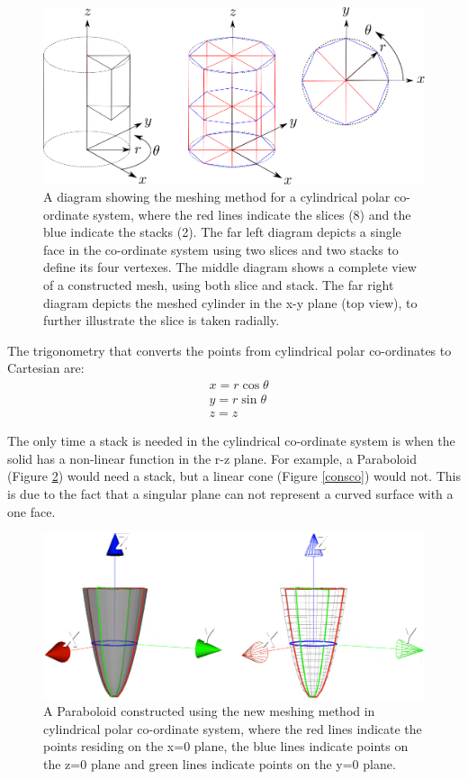 \documentclass[12pt,a4paper]{article}
\begin{document}
\begin{figure}[h!]
\centering
\includegraphics[scale=0.45]{Images//Coords//cyl.png}
\caption[width=\columnwidth]{A diagram showing the meshing method for a cylindrical polar co-ordinate system, where the red lines indicate the slices (8) and the blue indicate the stacks (2). The far left diagram depicts a single face in the co-ordinate system using two slices and two stacks to define its four vertexes. The middle diagram shows a complete view of a constructed mesh, using both slice and stack. The far right diagram depicts the meshed cylinder in the x-y plane (top view), to further illustrate the slice is taken radially.}
\label{cylmeshin}
\end{figure}
The trigonometry that converts the points from cylindrical polar co-ordinates to Cartesian are:
\begin{equation}
\begin{aligned}
\label{cyctrig}
& x = r \cos{\theta} \\
& y = r \sin{\theta} \\
& z = z
\end{aligned}
\end{equation}

\noindent The only time a stack is needed in the cylindrical co-ordinate system is when the solid has a non-linear function in the r-z plane. For example, a Paraboloid (Figure \ref{paraco}) would need a stack, but a linear cone (Figure \ref{consco}) would not. This is due to the fact that a singular plane can not represent a curved surface with a one face. 

\begin{figure}[h!]
\centering
\includegraphics[scale=0.3]{Images//Coords//para.png}
\caption[width=\columnwidth]{A Paraboloid constructed using the new meshing method in cylindrical polar co-ordinate system, where the red lines indicate the points residing on the x=0 plane, the blue lines indicate points on the z=0 plane and green lines indicate points on the y=0 plane.}
\label{paraco}
\end{figure}
\end{document}
